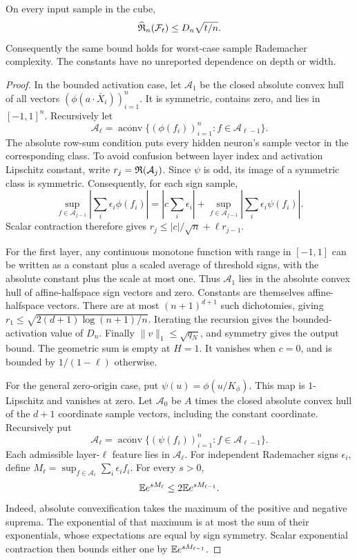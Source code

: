 \begin{lemma}
\label{lem:capacity}
On every input sample in the cube,
\[
 \widehat{\mathfrak R}_n(\mathcal F_t)\le D_n\sqrt{t/n}.
\]
Consequently the same bound holds for worst-case sample Rademacher complexity. The constants have no unreported dependence on depth or width.
\end{lemma}
\begin{proof}
In the bounded activation case, let $\mathcal A_1$ be the closed absolute convex hull of all vectors $(\phi(a\cdot\bar X_i))_{i=1}^n$. It is symmetric, contains zero, and lies in $[-1,1]^n$. Recursively let
\[
 \mathcal A_\ell=\overline{\operatorname{aconv}}\{(\phi(f_i))_{i=1}^n:f\in\mathcal A_{\ell-1}\}.
\]
The absolute row-sum condition puts every hidden neuron's sample vector in the corresponding class. To avoid confusion between layer index and activation Lipschitz constant, write $r_j=\mathfrak R(\mathcal A_j)$. Since $\psi$ is odd, its image of a symmetric class is symmetric. Consequently, for each sign sample,
\[
 \sup_{f\in\mathcal A_{j-1}}\left|\sum_i\epsilon_i\phi(f_i)\right|
 =\left|c\sum_i\epsilon_i\right|+
   \sup_{f\in\mathcal A_{j-1}}\left|\sum_i\epsilon_i\psi(f_i)\right|.
\]
Scalar contraction therefore gives $r_j\le |c|/\sqrt n+\ell r_{j-1}$.

For the first layer, any continuous monotone function with range in $[-1,1]$ can be written as a constant plus a scaled average of threshold signs, with the absolute constant plus the scale at most one. Thus $\mathcal A_1$ lies in the absolute convex hull of affine-halfspace sign vectors and zero. Constants are themselves affine-halfspace vectors. There are at most $(n+1)^{d+1}$ such dichotomies, giving $r_1\le\sqrt{2(d+1)\log(n+1)/n}$. Iterating the recursion gives the bounded-activation value of $D_n$. Finally $\|v\|_1\le\sqrt{q_N}$, and symmetry gives the output bound. The geometric sum is empty at $H=1$. It vanishes when $c=0$, and is bounded by $1/(1-\ell)$ otherwise.

For the general zero-origin case, put $\psi(u)=\phi(u/K_\phi)$. This map is $1$-Lipschitz and vanishes at zero. Let $\mathcal A_0$ be $A$ times the closed absolute convex hull of the $d+1$ coordinate sample vectors, including the constant coordinate. Recursively put
\[
 \mathcal A_\ell=\overline{\operatorname{aconv}}\{(\psi(f_i))_{i=1}^n:f\in\mathcal A_{\ell-1}\}.
\]
Each admissible layer-$\ell$ feature lies in $\mathcal A_\ell$. For independent Rademacher signs $\epsilon_i$, define
$M_\ell=\sup_{f\in\mathcal A_\ell}\sum_i\epsilon_i f_i$.
For every $s>0$,
\begin{equation}
 \mathbb E e^{sM_\ell}\le2\mathbb E e^{sM_{\ell-1}}.
 \label{eq:mgf-contraction}
\end{equation}
Indeed, absolute convexification takes the maximum of the positive and negative suprema. The exponential of that maximum is at most the sum of their exponentials, whose expectations are equal by sign symmetry. Scalar exponential contraction then bounds either one by $\mathbb E e^{sM_{\ell-1}}$.


\end{proof}
